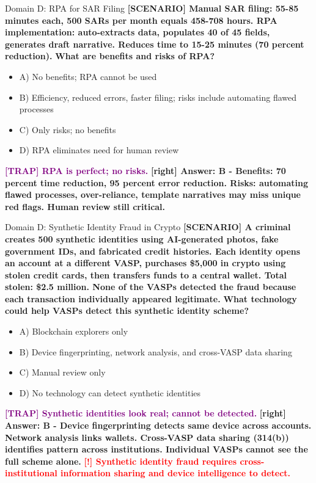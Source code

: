 \documentclass[11pt,a4paper]{beamer}
\newcommand{\redflag}[1]{\textcolor{red}{\textbf{[!] #1}}}
\newcommand{\trap}[1]{\textcolor{purple}{\textbf{[TRAP] #1}}}
\newcommand{\correct}[1]{\textcolor{green!50!black}{\textbf{[right] #1}}}
\newcommand{\scenario}[1]{\textcolor{blue!70!black}{\textbf{[SCENARIO] #1}}}
\begin{document}
\begin{frame}{Domain D: RPA for SAR Filing}
\scenario{Manual SAR filing: 55-85 minutes each, 500 SARs per month equals 458-708 hours. RPA implementation: auto-extracts data, populates 40 of 45 fields, generates draft narrative. Reduces time to 15-25 minutes (70 percent reduction).}
\vspace{0.2cm}
\textbf{What are benefits and risks of RPA?}
\vspace{0.2cm}
\begin{itemize}
    \item A) No benefits; RPA cannot be used
    \item B) Efficiency, reduced errors, faster filing; risks include automating flawed processes
    \item C) Only risks; no benefits
    \item D) RPA eliminates need for human review
\end{itemize}
\vspace{0.2cm}
\trap{RPA is perfect; no risks.}
\correct{Answer: B - Benefits: 70 percent time reduction, 95 percent error reduction. Risks: automating flawed processes, over-reliance, template narratives may miss unique red flags. Human review still critical.}
\end{frame}

\begin{frame}{Domain D: Synthetic Identity Fraud in Crypto}
\scenario{A criminal creates 500 synthetic identities using AI-generated photos, fake government IDs, and fabricated credit histories. Each identity opens an account at a different VASP, purchases \$5,000 in crypto using stolen credit cards, then transfers funds to a central wallet. Total stolen: \$2.5 million. None of the VASPs detected the fraud because each transaction individually appeared legitimate.}
\vspace{0.2cm}
\textbf{What technology could help VASPs detect this synthetic identity scheme?}
\vspace{0.2cm}
\begin{itemize}
    \item A) Blockchain explorers only
    \item B) Device fingerprinting, network analysis, and cross-VASP data sharing
    \item C) Manual review only
    \item D) No technology can detect synthetic identities
\end{itemize}
\vspace{0.2cm}
\trap{Synthetic identities look real; cannot be detected.}
\correct{Answer: B - Device fingerprinting detects same device across accounts. Network analysis links wallets. Cross-VASP data sharing (314(b)) identifies pattern across institutions. Individual VASPs cannot see the full scheme alone.}
\redflag{Synthetic identity fraud requires cross-institutional information sharing and device intelligence to detect.}
\end{frame}
\end{document}

